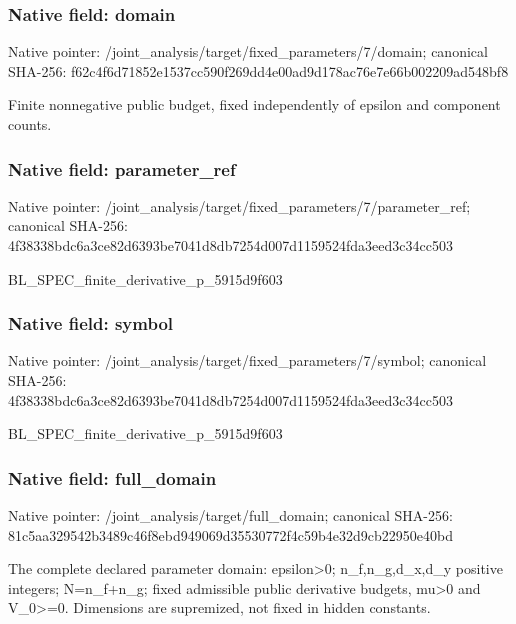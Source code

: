 \documentclass[10pt,a4paper]{article}
\begin{document}
\subsubsection{Native field: domain}
Native pointer: /joint\_\allowbreak{}analysis/target/fixed\_\allowbreak{}parameters/7/domain; canonical SHA-256: f62c4f6d71852e1537cc590f269dd4e00ad9d178ac76e7e66b002209ad548bf8

\begingroup\raggedright\sloppy Finite nonnegative public budget,\allowbreak{} fixed independently of epsilon and component counts.\par\endgroup

\subsubsection{Native field: parameter\_\allowbreak{}ref}
Native pointer: /joint\_\allowbreak{}analysis/target/fixed\_\allowbreak{}parameters/7/parameter\_\allowbreak{}ref; canonical SHA-256: 4f38338bdc6a3ce82d6393be7041d8db7254d007d1159524fda3eed3c34cc503

\begingroup\raggedright\sloppy BL\_\allowbreak{}SPEC\_\allowbreak{}finite\_\allowbreak{}derivative\_\allowbreak{}p\_\allowbreak{}5915d9f603\par\endgroup

\subsubsection{Native field: symbol}
Native pointer: /joint\_\allowbreak{}analysis/target/fixed\_\allowbreak{}parameters/7/symbol; canonical SHA-256: 4f38338bdc6a3ce82d6393be7041d8db7254d007d1159524fda3eed3c34cc503

\begingroup\raggedright\sloppy BL\_\allowbreak{}SPEC\_\allowbreak{}finite\_\allowbreak{}derivative\_\allowbreak{}p\_\allowbreak{}5915d9f603\par\endgroup

\subsubsection{Native field: full\_\allowbreak{}domain}
Native pointer: /joint\_\allowbreak{}analysis/target/full\_\allowbreak{}domain; canonical SHA-256: 81c5aa329542b3489c46f8ebd949069d35530772f4c59b4e32d9cb22950e40bd

\begingroup\raggedright\sloppy The complete declared parameter domain:\allowbreak{} epsilon>0;\allowbreak{} n\_\allowbreak{}f,\allowbreak{}n\_\allowbreak{}g,\allowbreak{}d\_\allowbreak{}x,\allowbreak{}d\_\allowbreak{}y positive integers;\allowbreak{} N=\allowbreak{}n\_\allowbreak{}f+n\_\allowbreak{}g;\allowbreak{} fixed admissible public derivative budgets,\allowbreak{} mu>0 and V\_\allowbreak{}0>=\allowbreak{}0. Dimensions are supremized,\allowbreak{} not fixed in hidden constants.\par\endgroup
\end{document}
